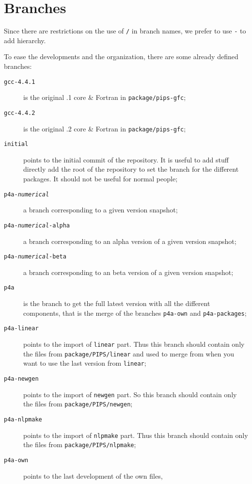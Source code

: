 \documentclass[a4paper]{article}
\begin{document}
\section{Branches}
\label{sec:branches}

Since there are restrictions on the use of \texttt{/} in branch names, we
prefer to use \texttt{-} to add hierarchy.

To ease the developments and the organization, there are some already
defined branches:
\begin{description}
\item[\texttt{gcc-4.4.1}] is the original .1 core \& Fortran in
  \texttt{package/pips-gfc};
\item[\texttt{gcc-4.4.2}] is the original .2 core \& Fortran in
  \texttt{package/pips-gfc};
\item[\texttt{initial}] points to the initial commit of the \Apfa
  repository. It is useful to add stuff directly add the root of the
  repository to set the branch for the different packages. It should not
  be useful for normal people;
\item[\texttt{p4a-\emph{numerical}}] a branch corresponding to a given version
  snapshot;
\item[\texttt{p4a-\emph{numerical}-alpha}] a branch corresponding to an alpha
  version of a given version snapshot;
\item[\texttt{p4a-\emph{numerical}-beta}] a branch corresponding to an beta
  version of a given version snapshot;
\item[\texttt{p4a}] is the branch to get the full latest \Apfa version
  with all the different components, that is the merge of the branches
  \texttt{p4a-own} and \texttt{p4a-packages};
\item[\texttt{p4a-linear}] points to the import of \Apips \texttt{linear}
  part. Thus this branch should contain only the files from
  \texttt{package/PIPS/linear} and used to merge from when you want to use
  the last version from \texttt{linear};
\item[\texttt{p4a-newgen}] points to the import of \Apips \texttt{newgen}
  part. So this branch should contain only the files from
  \texttt{package/PIPS/newgen};
\item[\texttt{p4a-nlpmake}] points to the import of \Apips \texttt{nlpmake}
  part. Thus this branch should contain only the files from
  \texttt{package/PIPS/nlpmake};
\item[\texttt{p4a-own}] points to the last development of the \Apfa own files,

\end{description}
\end{document}

